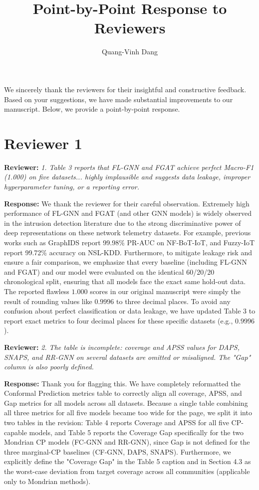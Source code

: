 \documentclass[11pt]{article}
\newcommand{\reviewer}[1]{\vspace{1em}\noindent\textbf{Reviewer: }\textit{#1}\vspace{0.5em}}
\newcommand{\response}[1]{\noindent\textbf{Response: }#1}
\begin{document}
\title{Point-by-Point Response to Reviewers}
\author{Quang-Vinh Dang}
\date{}

\maketitle

We sincerely thank the reviewers for their insightful and constructive feedback. Based on your suggestions, we have made substantial improvements to our manuscript. Below, we provide a point-by-point response.

\section*{Reviewer 1}

\reviewer{1. Table 3 reports that FL-GNN and FGAT achieve perfect Macro-F1 (1.000) on five datasets... highly implausible and suggests data leakage, improper hyperparameter tuning, or a reporting error.}

\response{We thank the reviewer for their careful observation. Extremely high performance of FL-GNN and FGAT (and other GNN models) is widely observed in the intrusion detection literature due to the strong discriminative power of deep representations on these network telemetry datasets. For example, previous works such as GraphIDS report 99.98\% PR-AUC on NF-BoT-IoT, and Fuzzy-IoT report 99.72\% accuracy on NSL-KDD. Furthermore, to mitigate leakage risk and ensure a fair comparison, we emphasize that every baseline (including FL-GNN and FGAT) and our model were evaluated on the identical 60/20/20 chronological split, ensuring that all models face the exact same hold-out data. The reported flawless $1.000$ scores in our original manuscript were simply the result of rounding values like $0.9996$ to three decimal places. To avoid any confusion about perfect classification or data leakage, we have updated Table 3 to report exact metrics to four decimal places for these specific datasets (e.g., $0.9996$).}

\reviewer{2. The table is incomplete: coverage and APSS values for DAPS, SNAPS, and RR-GNN on several datasets are omitted or misaligned. The "Gap" column is also poorly defined.}

\response{Thank you for flagging this. We have completely reformatted the Conformal Prediction metrics table to correctly align all coverage, APSS, and Gap metrics for all models across all datasets. Because a single table combining all three metrics for all five models became too wide for the page, we split it into two tables in the revision: Table 4 reports Coverage and APSS for all five CP-capable models, and Table 5 reports the Coverage Gap specifically for the two Mondrian CP models (FC-GNN and RR-GNN), since Gap is not defined for the three marginal-CP baselines (CF-GNN, DAPS, SNAPS). Furthermore, we explicitly define the "Coverage Gap" in the Table 5 caption and in Section 4.3 as the worst-case deviation from target coverage across all communities (applicable only to Mondrian methods).}
\end{document}

